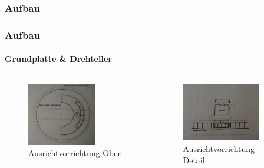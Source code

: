 \subsubsection{Aufbau}
\begin{frame}
	\frametitle{Aufbau\hfill{}\footnotesize \group}
	\framesubtitle{Grundplatte \& Drehteller}
	\begin{columns}
		\begin{column}{0.5\textwidth}
				\begin{figure}
					\centering
					\includegraphics[width=0.7\textwidth]{../../fig/Ausrichtvorrichtung_Oben.jpg}
					\caption{Ausrichtvorrichtung Oben}
				\end{figure}
		\end{column}
		\begin{column}{0.5\textwidth}
				\begin{figure}
					\centering
					\includegraphics[width=0.8\textwidth]{../../fig/Ausrichtvorrichtung_Detail.jpg}
					\caption{Ausrichtvorrichtung Detail}
				\end{figure}
		\end{column}
	\end{columns}
\end{frame}

